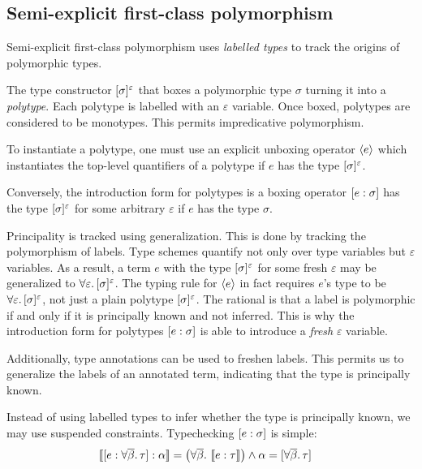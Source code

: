 \documentclass[acmsmall,screen,nonacm]{acmart}
\begin{document}
\subsection{Semi-explicit first-class polymorphism}


Semi-explicit first-class polymorphism \citep{TODO} uses \textit{labelled
types} to track the origins of polymorphic types.

The type constructor $[\sigma]^{\varepsilon}$ that boxes a polymorphic
type $\sigma$ turning it into a \textit{polytype}. Each polytype is labelled
with an $\varepsilon$ variable.  Once boxed, polytypes are considered to be
monotypes. This permits impredicative polymorphism.

To instantiate a polytype, one must use an explicit unboxing operator
$\langle e \rangle$ which instantiates the top-level quantifiers of a polytype if $e$
has the type $[\sigma]^{\varepsilon}$.

Conversely, the introduction form for polytypes is a boxing operator $[ e : \sigma ]$ has the type $[\sigma]^{\varepsilon}$ for some arbitrary
$\varepsilon$ if $e$ has the type $\sigma$.

Principality is tracked using generalization.  This is done by tracking the
polymorphism of labels. Type schemes quantify not only over type variables
but $\varepsilon$ variables. As a result, a term $e$ with the type $[\sigma]^{\varepsilon}$ for some fresh $\varepsilon$ may be generalized to
$\forall {\varepsilon}.\,{[\sigma]^{\varepsilon}}$.  The typing rule for
$\langle e \rangle$ in fact requires $e$'s type to be $\forall {\varepsilon}.\,{[\sigma]^{\varepsilon}}$, not just a plain polytype $[\sigma]^{\varepsilon}$. The rational is that a label is polymorphic if and only if it
is principally known and not inferred.  This is why the introduction form
for polytypes $[ e : \sigma ]$ is able to introduce a \textit{fresh}
$\varepsilon$ variable.

Additionally, type annotations can be used to freshen labels.  This permits
us to generalize the labels of an annotated term, indicating that the type
is principally known.


Instead of using labelled types to infer whether the type is principally
known, we may use suspended constraints.  Typechecking $[ e : \sigma ]$ is
simple:
\begin{align*}
  \llbracket [ e : \forall {\overline{\beta}}.\,{\tau} ] : \alpha \rrbracket &= \left(\forall {\overline{\beta}}. ~ \llbracket e : \tau \rrbracket \right) \wedge \alpha = [\forall {\overline{\beta}}.\,{\tau}]
\end{align*}
\end{document}

